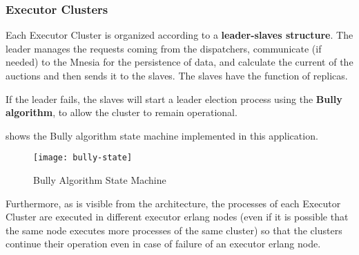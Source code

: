 \subsubsection{Executor Clusters}

Each Executor Cluster is organized according to a \textbf{leader-slaves
structure}. The leader manages the requests coming from the dispatchers,
communicate (if needed) to the Mnesia for the persistence of data, and calculate
the current  of the auctions and then sends it to the slaves.
The slaves have the function of replicas.

If the leader fails, the slaves will start a leader election process using the
\textbf{Bully algorithm}, to allow the cluster to remain operational.

 shows the Bully algorithm state machine implemented in
this application.

\begin{figure}[htb]
	\centering
	\texttt{[image: bully-state]}
	\caption{Bully Algorithm State Machine}\label{fig:bully-state}
\end{figure}

Furthermore, as is visible from the architecture, the processes of each Executor
Cluster are executed in different executor erlang nodes (even if it is possible
that the same node executes more processes of the same cluster) so that the
clusters continue their operation even in case of failure of an executor erlang
node.
